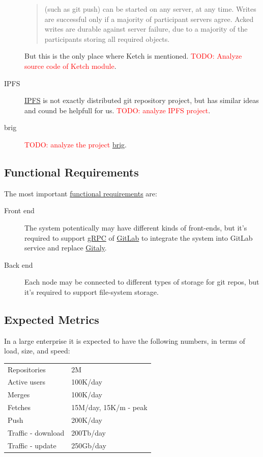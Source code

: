 \documentclass[12pt,oneside]{article}
\newcommand{\todo}[1]{\textcolor{red}{TODO: #1}}
\begin{document}
\begin{description}
\begin{quote}
      (such as git push) can be started on any server, at any time. Writes
      are successful only if a majority of participant servers agree.
      Acked writes are durable against server failure, due to a majority of
      the participants storing all required objects.
    \end{quote}
    But this is the only place where Ketch is mentioned. \todo{Analyze source code of Ketch module}.
  \item[IPFS]
    \href{https://ipfs.io/}{IPFS} is not exactly distributed git repository project, but has similar ideas
    and cound be helpfull for us. \todo{analyze IPFS project}.
  \item[brig]
    \todo{analyze the project} \href{https://github.com/sahib/brig}{brig}.
\end{description}

\subsection{Functional Requirements}
\label{sec:nfr}

The most important \href{https://en.wikipedia.org/wiki/Functional_requirement}{functional requirements} are:

\begin{description}
  \item[Front end]
    The system potentically may have different kinds of front-ends,
    but it's required to support \href{https://grpc.io/}{gRPC}
    of \href{https://about.gitlab.com/}{GitLab} to integrate the system
    into GitLab service and replace
    \href{https://docs.gitlab.com/ee/administration/gitaly/}{Gitaly}.
  \item[Back end]
    Each node may be connected to different types of storage for git repos,
    but it's required to support file-system storage.
\end{description}

\subsection{Expected Metrics}
\label{ref:metrics}

In a large enterprise it is expected to have the following
numbers, in terms of load, size, and speed:

\begin{tabular}{ll}
  Repositories & 2M \\
  Active users & 100K/day \\
  Merges & 100K/day \\
  Fetches & 15M/day, 15K/m - peak \\
  Push & 200K/day \\
  Traffic - download & 200Tb/day \\
  Traffic - update & 250Gb/day \\
\end{tabular}

\printbibliography%
\end{document}
